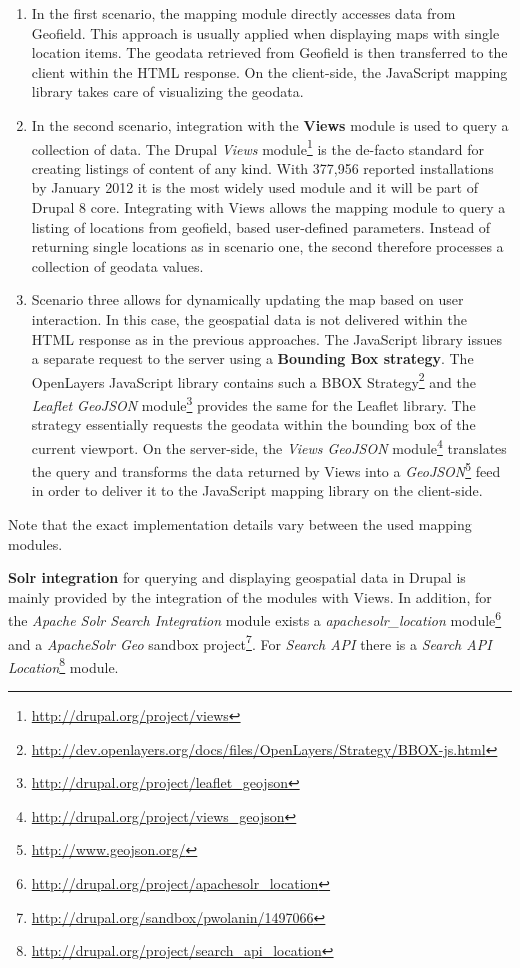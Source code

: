 \begin{enumerate}

\item In the first scenario, the mapping module directly accesses data from Geofield. This approach is usually applied when displaying maps with single location items. The geodata retrieved from Geofield is then transferred to the client within the HTML response. On the client-side, the JavaScript mapping library takes care of visualizing the geodata.

\item In the second scenario, integration with the \textbf{Views} module is used to query a collection of data. The Drupal \textit{Views} module\footnote{\url{http://drupal.org/project/views}} is the de-facto standard for creating listings of content of any kind. With 377,956 reported installations by January 2012 it is the most widely used module and it will be part of Drupal 8 core. Integrating with Views allows the mapping module to query a listing of locations from geofield, based user-defined parameters. Instead of returning single locations as in scenario one, the second therefore processes a collection of geodata values. 

\item Scenario three allows for dynamically updating the map based on user interaction. In this case, the geospatial data is not delivered within the HTML response as in the previous approaches. The JavaScript library issues a separate request to the server using a \textbf{Bounding Box strategy}. The OpenLayers JavaScript library contains such a BBOX Strategy\footnote{\url{http://dev.openlayers.org/docs/files/OpenLayers/Strategy/BBOX-js.html}} and the \textit{Leaflet GeoJSON} module\footnote{\url{http://drupal.org/project/leaflet_geojson}} provides the same for the Leaflet library. The strategy essentially requests the geodata within the bounding box of the current viewport. On the server-side, the \textit{Views GeoJSON} module\footnote{\url{http://drupal.org/project/views_geojson}} translates the query and transforms the data returned by Views into a \textit{GeoJSON}\footnote{\url{http://www.geojson.org/}} feed in order to deliver it to the JavaScript mapping library on the client-side.

\end{enumerate}

Note that the exact implementation details vary between the used mapping modules.

\textbf{Solr integration} for querying and displaying geospatial data in Drupal is mainly provided by the integration of the modules with Views. In addition, for the \textit{Apache Solr Search Integration} module exists a \textit{apachesolr\_location} module\footnote{\url{http://drupal.org/project/apachesolr_location}} and a \textit{ApacheSolr Geo} sandbox project\footnote{\url{http://drupal.org/sandbox/pwolanin/1497066}}. For \textit{Search API} there is a \textit{Search API Location}\footnote{\url{http://drupal.org/project/search_api_location}} module.


